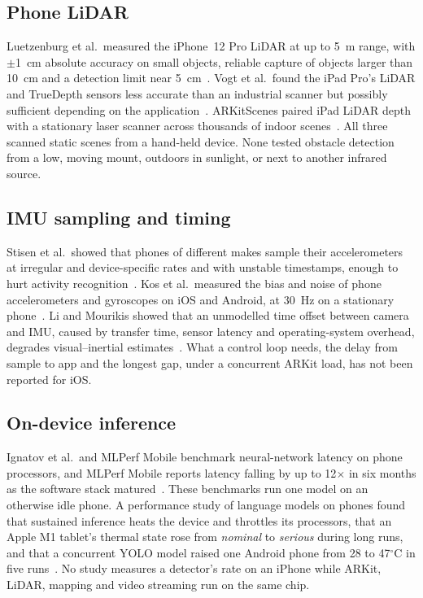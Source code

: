 \subsection{Phone LiDAR}

Luetzenburg et al.\ measured the iPhone~12 Pro LiDAR at up to 5~m range, with $\pm$1~cm absolute accuracy on small objects, reliable capture of objects larger than 10~cm and a detection limit near 5~cm~\citep{luetzenburg2021iphone}.
Vogt et al.\ found the iPad Pro's LiDAR and TrueDepth sensors less accurate than an industrial scanner but possibly sufficient depending on the application~\citep{vogt2021ipad}.
ARKitScenes paired iPad LiDAR depth with a stationary laser scanner across thousands of indoor scenes~\citep{baruch2021arkitscenes}.
All three scanned static scenes from a hand-held device.
None tested obstacle detection from a low, moving mount, outdoors in sunlight, or next to another infrared source.

\subsection{IMU sampling and timing}

Stisen et al.\ showed that phones of different makes sample their accelerometers at irregular and device-specific rates and with unstable timestamps, enough to hurt activity recognition~\citep{stisen2015smart}.
Kos et al.\ measured the bias and noise of phone accelerometers and gyroscopes on iOS and Android, at 30~Hz on a stationary phone~\citep{kos2016inertial}.
Li and Mourikis showed that an unmodelled time offset between camera and IMU, caused by transfer time, sensor latency and operating-system overhead, degrades visual--inertial estimates~\citep{li2014temporal}.
What a control loop needs, the delay from sample to app and the longest gap, under a concurrent ARKit load, has not been reported for iOS.

\subsection{On-device inference}

Ignatov et al.\ and MLPerf Mobile benchmark neural-network latency on phone processors, and MLPerf Mobile reports latency falling by up to 12$\times$ in six months as the software stack matured~\citep{ignatov2019aibenchmark,reddi2022mlperfmobile}.
These benchmarks run one model on an otherwise idle phone.
A performance study of language models on phones found that sustained inference heats the device and throttles its processors, that an Apple M1 tablet's thermal state rose from \emph{nominal} to \emph{serious} during long runs, and that a concurrent YOLO model raised one Android phone from 28 to 47$^\circ$C in five runs~\citep{xiao2024llmpocket}.
No study measures a detector's rate on an iPhone while ARKit, LiDAR, mapping and video streaming run on the same chip.

